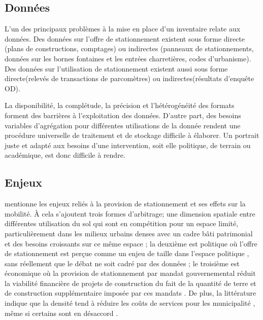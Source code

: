 \subsection{Données}

L'un des principaux problèmes à la mise en place d'un inventaire relate aux données. Des données sur l'offre de stationnement existent sous forme directe (plans de constructions, comptages) ou indirectes (panneaux de stationnements, données sur les bornes fontaines et les entrées charretières, codes d'urbanisme). Des données sur l'utilisation de stationnement existent aussi sous forme directe(relevés de transactions de parcomètres) ou indirectes(résultats d'enquête OD).\par
La disponibilité, la complétude, la précision et l'hétérogénéité des formats forment des barrières à l'exploitation des données. D'autre part, des besoins variables d'agrégation pour différentes utilisations de la donnée rendent une procédure universelle de traitement et de stockage difficile à élaborer. Un portrait juste et adapté aux besoins d'une intervention, soit elle politique, de terrain ou académique, est donc difficile à rendre.

\subsection{Enjeux}

\textcite{bourdeau_methodologie_2014} mentionne les enjeux reliés à la provision de  stationnement et ses effets sur la mobilité. À cela s'ajoutent trois formes d'arbitrage; une dimension spatiale entre différentes utilisation du sol qui sont en compétition pour un espace limité, particulièrement dans les milieux urbains denses avec un cadre bâti patrimonial et des besoins croissants sur ce même espace ; la deuxième est politique où l'offre de stationnement est perçue comme un enjeu de taille dans l'espace politique \parencite{mattioli_political_2020,button_political_2006}, sans réellement que le débat ne soit cadré par des données ; le troisième est économique où la provision de stationnement par mandat gouvernemental réduit la viabilité financière de projets de construction du fait de la quantité de terre et de construction supplémentaire imposée par ces mandats \parencite{cutter_parking_2012,jung_who_2011}. De plus, la littérature indique que la densité tend à réduire les coûts de services pour les municipalité \parencite{garrido-jimenez_municipal_2018,metro_vancouver_regional_planning_cost_2023,blais_perverse_2024}, même si certains sont en désaccord \parencite{ladd_population_1992,windsor_critique_1979}.



